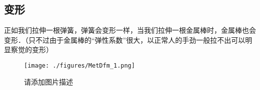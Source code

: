 
\subsection{变形}
正如我们拉伸一根弹簧，弹簧会变形一样，当我们拉伸一根金属棒时，金属棒也会变形．（只不过由于金属棒的“弹性系数”很大，以正常人的手劲一般拉不出可以明显察觉的变形）

\begin{figure}[ht]
\centering
\texttt{[image: ./figures/MetDfm\_1.png]}
\caption{请添加图片描述} \label{MetDfm_fig1}
\end{figure}